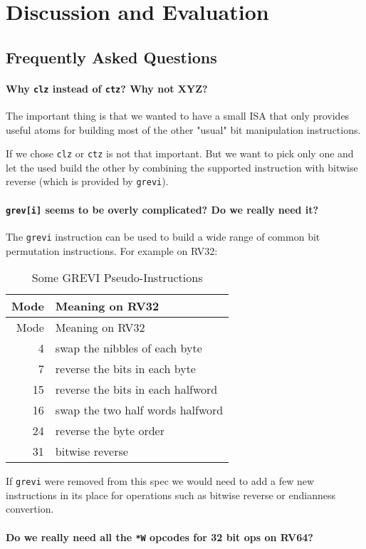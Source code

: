 \chapter{Discussion and Evaluation}

\section{Frequently Asked Questions}

\subsubsection{Why \texttt{clz} instead of \texttt{ctz}? Why not XYZ?}

The important thing is that we wanted to have a small ISA that only provides
useful atoms for building most of the other "usual" bit manipulation
instructions.

If we chose \texttt{clz} or \texttt{ctz} is not that important. But we want to
pick only one and let the used build the other by combining the supported
instruction with bitwise reverse (which is provided by \texttt{grevi}).

\subsubsection{\texttt{grev[i]} seems to be overly complicated? Do we really need it?}

The \texttt{grevi} instruction can be used to build a wide range of common
bit permutation instructions. For example on RV32:

\begin{longtable}[c]{@{}rl@{}}
\caption{Some GREVI Pseudo-Instructions}\tabularnewline
\toprule
Mode & Meaning on RV32\tabularnewline
\midrule
\endfirsthead
\toprule
Mode & Meaning on RV32\tabularnewline
\midrule
\endhead
4 & swap the nibbles of each byte\tabularnewline
7 & reverse the bits in each byte\tabularnewline
15 & reverse the bits in each halfword\tabularnewline
16 & swap the two half words halfword\tabularnewline
24 & reverse the byte order\tabularnewline
31 & bitwise reverse\tabularnewline
\bottomrule
\end{longtable}

If \texttt{grevi} were removed from this spec we would need to add a few new
instructions in its place for operations such as bitwise reverse or
endianness convertion.

\subsubsection{Do we really need all the \texttt{*W} opcodes for 32 bit ops on RV64?}

